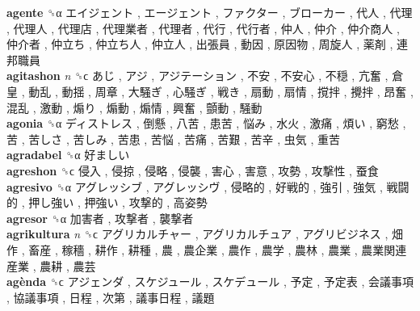 \textbf{agente} ␝α   エイジェント ,  エージェント ,  ファクター ,  ブローカー ,  代人 ,  代理 ,  代理人 ,  代理店 ,  代理業者 ,  代理者 ,  代行 ,  代行者 ,  仲人 ,  仲介 ,  仲介商人 ,  仲介者 ,  仲立ち ,  仲立ち人 ,  仲立人 ,  出張員 ,  動因 ,  原因物 ,  周旋人 ,  薬剤 ,  連邦職員   \\
\textbf{agitashon} \emph{n}  ␝ϲ   あじ ,  アジ ,  アジテーション ,  不安 ,  不安心 ,  不穏 ,  亢奮 ,  倉皇 ,  動乱 ,  動揺 ,  周章 ,  大騒ぎ ,  心騒ぎ ,  戦き ,  扇動 ,  扇情 ,  撹拌 ,  攪拌 ,  昂奮 ,  混乱 ,  激動 ,  煽り ,  煽動 ,  煽情 ,  興奮 ,  顫動 ,  騒動   \\
\textbf{agonia} ␝α   ディストレス ,  倒懸 ,  八苦 ,  患苦 ,  悩み ,  水火 ,  激痛 ,  煩い ,  窮愁 ,  苦 ,  苦しさ ,  苦しみ ,  苦患 ,  苦悩 ,  苦痛 ,  苦艱 ,  苦辛 ,  虫気 ,  重苦   \\
\textbf{agradabel} ␝α   好ましい   \\
\textbf{agreshon} ␝ϲ   侵入 ,  侵掠 ,  侵略 ,  侵襲 ,  害心 ,  害意 ,  攻勢 ,  攻撃性 ,  蚕食   \\
\textbf{agresivo} ␝α   アグレッシブ ,  アグレッシヴ ,  侵略的 ,  好戦的 ,  強引 ,  強気 ,  戦闘的 ,  押し強い ,  押強い ,  攻撃的 ,  高姿勢   \\
\textbf{agresor} ␝α   加害者 ,  攻撃者 ,  襲撃者   \\
\textbf{agrikultura} \emph{n}  ␝ϲ   アグリカルチャー ,  アグリカルチュア ,  アグリビジネス ,  畑作 ,  畜産 ,  稼穡 ,  耕作 ,  耕種 ,  農 ,  農企業 ,  農作 ,  農学 ,  農林 ,  農業 ,  農業関連産業 ,  農耕 ,  農芸   \\
\textbf{agènda} ␝ϲ   アジェンダ ,  スケジュール ,  スケデュール ,  予定 ,  予定表 ,  会議事項 ,  協議事項 ,  日程 ,  次第 ,  議事日程 ,  議題   \\
